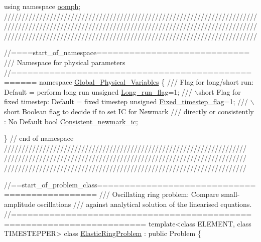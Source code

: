 \begin{DoxyCodeInclude}
\textcolor{keyword}{using namespace }\hyperlink{namespaceoomph}{oomph};
\textcolor{comment}{}
\textcolor{comment}{////////////////////////////////////////////////////////////////////////}
\textcolor{comment}{////////////////////////////////////////////////////////////////////////}
\textcolor{comment}{////////////////////////////////////////////////////////////////////////}
\textcolor{comment}{}

\textcolor{comment}{//====start\_of\_namespace============================}\textcolor{comment}{}
\textcolor{comment}{/// Namespace for physical parameters}
\textcolor{comment}{}\textcolor{comment}{//==================================================}
\textcolor{keyword}{namespace }\hyperlink{namespaceGlobal__Physical__Variables}{Global\_Physical\_Variables}
\{
\textcolor{comment}{}
\textcolor{comment}{ /// Flag for long/short run: Default =  perform long run}
\textcolor{comment}{} \textcolor{keywordtype}{unsigned} \hyperlink{namespaceGlobal__Physical__Variables_acb18f0e4952b6a1b0840ca94828ace3b}{Long\_run\_flag}=1;
\textcolor{comment}{}
\textcolor{comment}{ /// \(\backslash\)short Flag for fixed timestep: Default = fixed timestep}
\textcolor{comment}{} \textcolor{keywordtype}{unsigned} \hyperlink{namespaceGlobal__Physical__Variables_aae2e69454e5e73519e13dd3424d41a2c}{Fixed\_timestep\_flag}=1;
\textcolor{comment}{}
\textcolor{comment}{ /// \(\backslash\)short Boolean flag to decide if to set IC for Newmark}
\textcolor{comment}{ /// directly or consistently : No Default}
\textcolor{comment}{} \textcolor{keywordtype}{bool} \hyperlink{namespaceGlobal__Physical__Variables_affe3ddb0b7c1d7dbf3955738edbda1af}{Consistent\_newmark\_ic};

\} \textcolor{comment}{// end of namespace}
\textcolor{comment}{}
\textcolor{comment}{/////////////////////////////////////////////////////////////////////}
\textcolor{comment}{/////////////////////////////////////////////////////////////////////}
\textcolor{comment}{/////////////////////////////////////////////////////////////////////}
\textcolor{comment}{}


\textcolor{comment}{//==start\_of\_problem\_class==============================================}\textcolor{comment}{}
\textcolor{comment}{/// Oscillating ring problem: Compare small-amplitude oscillations}
\textcolor{comment}{/// against analytical solution of the linearised equations.}
\textcolor{comment}{}\textcolor{comment}{//======================================================================}
\textcolor{keyword}{template}<\textcolor{keyword}{class} ELEMENT, \textcolor{keyword}{class} TIMESTEPPER>
\textcolor{keyword}{class }\hyperlink{classElasticRingProblem}{ElasticRingProblem} : \textcolor{keyword}{public} Problem
\{


\end{DoxyCodeInclude}
